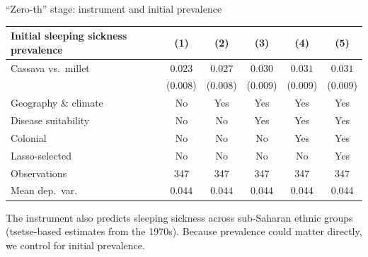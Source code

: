 \documentclass[aspectratio=1610]{beamer}
\newcommand{\returnbutton}[1]{\par\vfill\hfill\hyperlink{#1}{\beamerreturnbutton{Back}}}
\begin{document}
\begin{frame}[label=bk-zeroth]{``Zero-th'' stage: instrument and initial prevalence}
  \centering
  \footnotesize
  \begin{tabular}{lccccc}
    \toprule
    Initial sleeping sickness prevalence & (1) & (2) & (3) & (4) & (5) \\
    \midrule
    Cassava vs.\ millet & $0.023$ & $0.027$ & $0.030$ & $0.031$ & $0.031$ \\
                        & (0.008) & (0.008) & (0.009) & (0.009) & (0.009) \\
    \midrule
    Geography \& climate & No & Yes & Yes & Yes & Yes \\
    Disease suitability  & No & No  & Yes & Yes & Yes \\
    Colonial             & No & No  & No  & Yes & Yes \\
    Lasso-selected       & No & No  & No  & No  & Yes \\
    Observations & 347 & 347 & 347 & 347 & 347 \\
    Mean dep.\ var. & 0.044 & 0.044 & 0.044 & 0.044 & 0.044 \\
    \bottomrule
  \end{tabular}

  \vspace{0.5em}
  \raggedright\small
  The instrument also predicts sleeping sickness across sub-Saharan ethnic groups (tsetse-based
  estimates from the 1970s). Because prevalence could matter directly, we control for initial prevalence.
  \returnbutton{main-relevance}
\end{frame}
\end{document}
